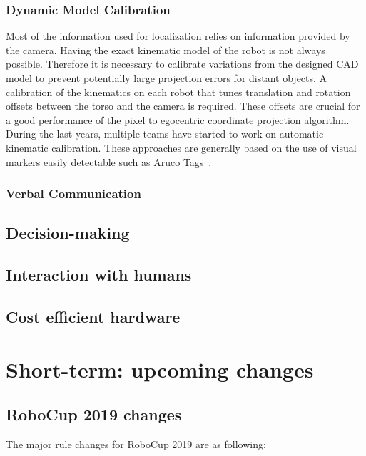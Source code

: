\documentclass{article}
\begin{document}
\subsubsection{Dynamic Model Calibration}
Most of the information used for localization relies on information provided by the camera. 
Having the exact kinematic model of the robot is not always possible. 
Therefore it is necessary to calibrate variations from the designed CAD model to prevent potentially large projection errors for distant objects. 
A calibration of the kinematics on each robot that tunes translation and rotation offsets between the torso and the camera is required. 
These offsets are crucial for a good performance of the pixel to egocentric coordinate projection algorithm.
During the last years, multiple teams have started to work on automatic kinematic calibration. 
These approaches are generally based on the use of visual markers easily detectable such as Aruco Tags~\cite{Garrido-Jurado2014}.

\subsubsection{Verbal Communication}


\subsection{Decision-making}

\subsection{Interaction with humans}

\subsection{Cost efficient hardware}

\section{\label{sec:ShortTerm}Short-term: upcoming changes}

\subsection{RoboCup 2019 changes}

The major rule changes for RoboCup 2019 are as following:
\end{document}
